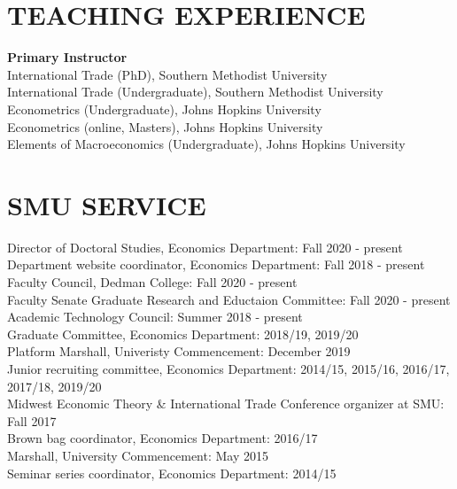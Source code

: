 \documentclass[11pt]{res}
\begin{document}
\begin{resume}
\section{TEACHING EXPERIENCE} \vspace{1.5mm}
{\bf Primary Instructor}\vspace{1.5mm}\\
International Trade (PhD), Southern Methodist University\vspace{1.5mm}\\
International Trade (Undergraduate), Southern Methodist University\vspace{1.5mm}\\
Econometrics (Undergraduate), Johns Hopkins University\vspace{1.5mm}\\
Econometrics (online, Masters), Johns Hopkins University\vspace{1.5mm}\\
Elements of Macroeconomics (Undergraduate), Johns Hopkins University

\section{SMU SERVICE} \vspace{1.5mm}
Director of Doctoral Studies, Economics Department: Fall 2020 - present\vspace{1.5mm}\\
Department website coordinator, Economics Department: Fall 2018 - present\vspace{1.5mm}\\
Faculty Council, Dedman College: Fall 2020 - present\vspace{1.5mm}\\
Faculty Senate Graduate Research and Eductaion Committee: Fall 2020 - present\vspace{1.5mm}\\
Academic Technology Council: Summer 2018 - present\vspace{1.5mm}\\
Graduate Committee, Economics Department: 2018/19, 2019/20\vspace{1.5mm}\\
Platform Marshall, Univeristy Commencement: December 2019\vspace{1.5mm}\\
Junior recruiting committee, Economics Department: 2014/15, 2015/16, 2016/17, 2017/18, 2019/20\vspace{1.5mm}\\
Midwest Economic Theory \& International Trade Conference organizer at SMU: Fall 2017\vspace{1.5mm}\\
Brown bag coordinator, Economics Department: 2016/17\vspace{1.5mm}\\
Marshall, University Commencement: May 2015\vspace{1.5mm}\\
Seminar series coordinator, Economics Department: 2014/15


\end{resume}
\end{document}
